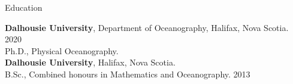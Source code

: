 \documentclass{resume} %
\begin{document}

\begin{rSection}{Education}


\textbf{Dalhousie University}, Department of Oceanography, Halifax, Nova Scotia. \hfill 2020 \\
Ph.D., Physical Oceanography. \\


\textbf{Dalhousie University}, Halifax, Nova Scotia. \\
B.Sc., Combined honours in Mathematics and Oceanography. \hfill 2013 \\

\end{rSection}

\end{document}
